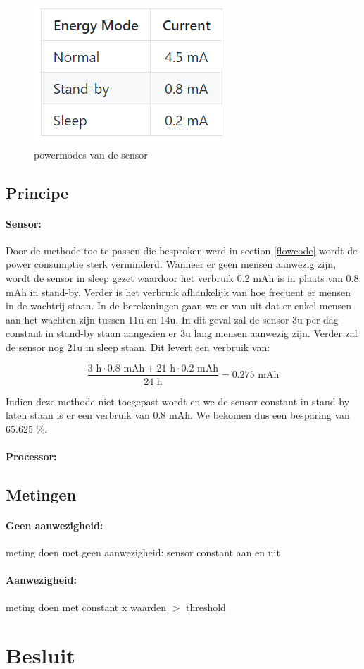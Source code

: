 \documentclass[]{article}
\begin{document}
\begin{figure}[!ht]
	\centering
	\includegraphics{sensor_power.png}
	\caption{powermodes van de sensor}
	\label{fig:sensor_power}
\end{figure}

\subsection{Principe}
\paragraph{Sensor: }
Door de methode toe te passen die besproken werd in section \ref{flowcode} wordt de power consumptie sterk verminderd. Wanneer er geen mensen aanwezig zijn, wordt de sensor in sleep gezet waardoor het verbruik 0.2 mAh is in plaats van 0.8 mAh in stand-by. Verder is het verbruik afhankelijk van hoe frequent er mensen in de wachtrij staan. In de berekeningen gaan we er van uit dat er enkel mensen aan het wachten zijn tussen 11u en 14u. In dit geval zal de sensor 3u per dag constant in stand-by staan aangezien er 3u lang mensen aanwezig zijn. Verder zal de sensor nog 21u in sleep staan. Dit levert een verbruik van: 


\begin{equation}
	\frac{3 \text{ h}\cdot 0.8 \text{ mAh} + 21 \text{ h}\cdot 0.2 \text{ mAh}}{24 \text{ h}} = 0.275 \text{ mAh}
\end{equation}

Indien deze methode niet toegepast wordt en we de sensor constant in stand-by laten staan is er een verbruik van 0.8 mAh. We bekomen dus een besparing van 65.625 \%. 
\paragraph{Processor: }

\subsection{Metingen}
\paragraph{Geen aanwezigheid: }
meting doen met geen aanwezigheid: sensor constant aan en uit

\paragraph{Aanwezigheid: }
meting doen met constant x waarden $>$ threshold


\section{Besluit }
\end{document}
